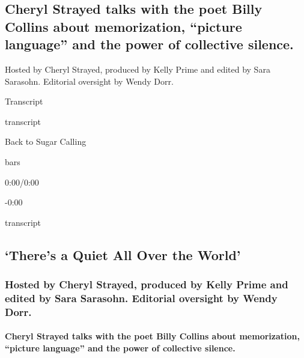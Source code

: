 \hypertarget{cheryl-strayed-talks-with-the-poet-billy-collins-about-memorization-picture-language-and-the-power-of-collective-silence-1}{%
\subsection{Cheryl Strayed talks with the poet Billy Collins about
memorization, ``picture language'' and the power of collective
silence.}\label{cheryl-strayed-talks-with-the-poet-billy-collins-about-memorization-picture-language-and-the-power-of-collective-silence-1}}

Hosted by Cheryl Strayed, produced by Kelly Prime and edited by Sara
Sarasohn. Editorial oversight by Wendy Dorr.

Transcript

transcript

Back to Sugar Calling

bars

0:00/0:00

-0:00

transcript

\hypertarget{theres-a-quiet-all-over-the-world-2}{%
\subsection{`There's a Quiet All Over the
World'}\label{theres-a-quiet-all-over-the-world-2}}

\hypertarget{hosted-by-cheryl-strayed-produced-by-kelly-prime-and-edited-by-sara-sarasohn-editorial-oversight-by-wendy-dorr-1}{%
\subsubsection{Hosted by Cheryl Strayed, produced by Kelly Prime and
edited by Sara Sarasohn. Editorial oversight by Wendy
Dorr.}\label{hosted-by-cheryl-strayed-produced-by-kelly-prime-and-edited-by-sara-sarasohn-editorial-oversight-by-wendy-dorr-1}}

\hypertarget{cheryl-strayed-talks-with-the-poet-billy-collins-about-memorization-picture-language-and-the-power-of-collective-silence-2}{%
\paragraph{Cheryl Strayed talks with the poet Billy Collins about
memorization, ``picture language'' and the power of collective
silence.}\label{cheryl-strayed-talks-with-the-poet-billy-collins-about-memorization-picture-language-and-the-power-of-collective-silence-2}}


